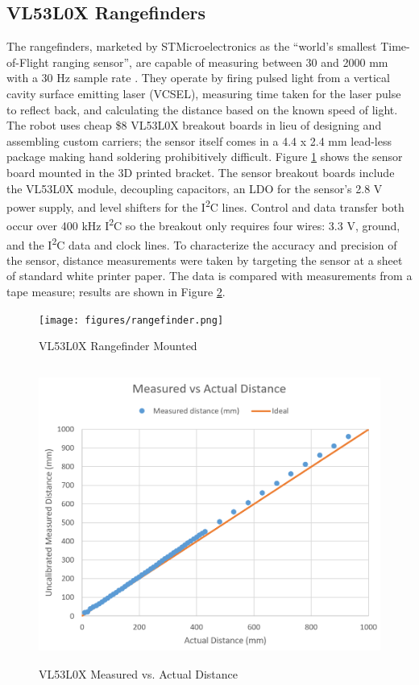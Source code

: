 \subsection{VL53L0X Rangefinders}
The rangefinders, marketed by STMicroelectronics as the ``world's smallest Time-of-Flight ranging sensor'', are capable of measuring between 30 and 2000 mm with a 30 Hz sample rate \cite{vl53l0x}. They operate by firing pulsed light from a vertical cavity surface emitting laser (VCSEL), measuring time taken for the laser pulse to reflect back, and calculating the distance based on the known speed of light. The robot uses cheap \$8 VL53L0X breakout boards in lieu of designing and assembling custom carriers; the sensor itself comes in a 4.4 x 2.4 mm lead-less package making hand soldering prohibitively difficult. Figure \ref{fig:rangefinder} shows the sensor board mounted in the 3D printed bracket. The sensor breakout boards include the VL53L0X module, decoupling capacitors, an LDO for the sensor's 2.8 V power supply, and level shifters for the I\textsuperscript{2}C lines. Control and data transfer both occur over 400 kHz I\textsuperscript{2}C so the breakout only requires four wires: 3.3 V, ground, and the I\textsuperscript{2}C data and clock lines. To characterize the accuracy and precision of the sensor, distance measurements were taken by targeting the sensor at a sheet of standard white printer paper. The data is compared with measurements from a tape measure; results are shown in Figure \ref{fig:rangefinder_measurement}. 
\begin{figure}[H]   %
	\centering \texttt{[image: figures/rangefinder.png]}
	\caption{VL53L0X Rangefinder Mounted}\label{fig:rangefinder}
\end{figure}
\begin{figure}[H]   %
	\centering \includegraphics[width=6in, height=3.85in, keepaspectratio]{figures/rangefinder_measurement.png}
	\caption{VL53L0X Measured vs. Actual Distance}\label{fig:rangefinder_measurement}
\end{figure}
